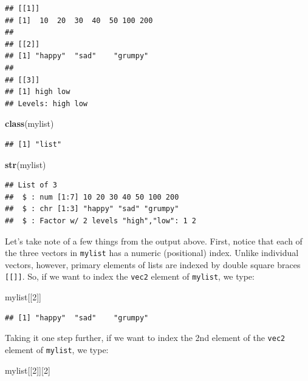 \documentclass[]{book}
\newenvironment{Shaded}{\begin{snugshade}}{\end{snugshade}}
\newcommand{\DecValTok}[1]{\textcolor[rgb]{0.00,0.00,0.81}{#1}}
\newcommand{\KeywordTok}[1]{\textcolor[rgb]{0.13,0.29,0.53}{\textbf{#1}}}
\newcommand{\NormalTok}[1]{#1}
\begin{document}
\begin{verbatim}
## [[1]]
## [1]  10  20  30  40  50 100 200
## 
## [[2]]
## [1] "happy"  "sad"    "grumpy"
## 
## [[3]]
## [1] high low 
## Levels: high low
\end{verbatim}

\begin{Shaded}
\begin{Highlighting}[]
\KeywordTok{class}\NormalTok{(mylist)}
\end{Highlighting}
\end{Shaded}

\begin{verbatim}
## [1] "list"
\end{verbatim}

\begin{Shaded}
\begin{Highlighting}[]
\KeywordTok{str}\NormalTok{(mylist)}
\end{Highlighting}
\end{Shaded}

\begin{verbatim}
## List of 3
##  $ : num [1:7] 10 20 30 40 50 100 200
##  $ : chr [1:3] "happy" "sad" "grumpy"
##  $ : Factor w/ 2 levels "high","low": 1 2
\end{verbatim}

Let's take note of a few things from the output above. First, notice that each of the three vectors in \texttt{mylist} has a numeric (positional) index. Unlike individual vectors, however, primary elements of lists are indexed by double square braces \texttt{{[}{[}{]}{]}}. So, if we want to index the \texttt{vec2} element of \texttt{mylist}, we type:

\begin{Shaded}
\begin{Highlighting}[]
\NormalTok{mylist[[}\DecValTok{2}\NormalTok{]]}
\end{Highlighting}
\end{Shaded}

\begin{verbatim}
## [1] "happy"  "sad"    "grumpy"
\end{verbatim}

Taking it one step further, if we want to index the 2nd element of the \texttt{vec2} element of \texttt{mylist}, we type:

\begin{Shaded}
\begin{Highlighting}[]
\NormalTok{mylist[[}\DecValTok{2}\NormalTok{]][}\DecValTok{2}\NormalTok{]}
\end{Highlighting}
\end{Shaded}
\end{document}
